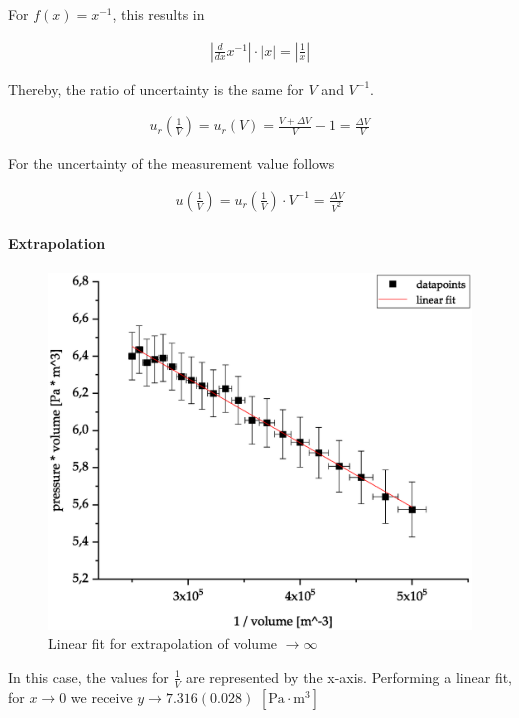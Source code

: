 \documentclass[10pt,a4paper]{article}
\begin{document}
For $f(x) = x^{-1}$, this results in

\begin{align}
|\frac{d}{dx} x^{-1}| \cdot |x| = |\frac{1}{x}|
\end{align}

Thereby, the ratio of uncertainty is the same for $V$ and $V^{-1}$.

\begin{align}
u_r(\frac{1}{V}) = u_r(V) = \frac{V + \Delta V}{V} - 1 = \frac{\Delta V}{V}
\end{align}

For the uncertainty of the measurement value follows

\begin{align}
u(\frac{1}{V}) = u_r(\frac{1}{V}) \cdot V^{-1} = \frac{\Delta V}{V^2} 
\end{align}

\paragraph{Extrapolation}

\begin{figure}[hbt!]
\includegraphics[width=\textwidth]{Graph2.eps}
\caption{Linear fit for extrapolation of volume $\rightarrow \infty$}
\label{fig:length_eight_mouse}
\end{figure}

In this case, the values for $\frac{1}{V}$ are represented by the x-axis. Performing a linear fit, for $x \rightarrow 0$ we receive $y \rightarrow 7.316 (0.028)$ $[\textrm{Pa} \cdot \textrm{m}^3]$
\end{document}
